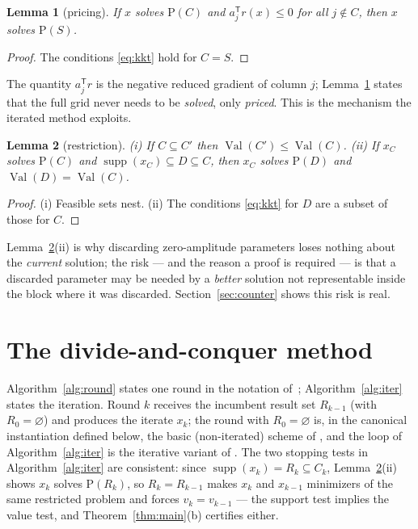 \documentclass[pdflatex,sn-mathphys-num]{sn-jnl}
\theoremstyle{thmstyleone}
\newtheorem{lemma}{Lemma}
\theoremstyle{thmstyletwo}
\newcommand{\supp}{\operatorname{supp}}
\newcommand{\Val}{\operatorname{Val}}
\newcommand{\T}{{\mathsf T}}
\newcommand{\prob}[1]{\mathrm{P}(#1)}
\begin{document}
\begin{lemma}[pricing]\label{lem:pricing}
If $x$ solves $\prob{C}$ and $a_j^{\T}r(x)\le0$ for all $j\notin C$,
then $x$ solves $\prob{S}$.
\end{lemma}
\begin{proof}
The conditions \eqref{eq:kkt} hold for $C=S$.
\end{proof}

The quantity $a_j^{\T}r$ is the negative reduced gradient of column
$j$; Lemma~\ref{lem:pricing} states that the full grid never needs to be
\emph{solved}, only \emph{priced}. This is the mechanism the iterated
method exploits.

\begin{lemma}[restriction]\label{lem:restrict}
\emph{(i)} If $C\subseteq C'$ then $\Val(C')\le\Val(C)$.
\emph{(ii)} If $x_C$ solves $\prob{C}$ and
$\supp(x_C)\subseteq D\subseteq C$, then $x_C$ solves $\prob{D}$ and
$\Val(D)=\Val(C)$.
\end{lemma}
\begin{proof}
(i) Feasible sets nest. (ii) The conditions \eqref{eq:kkt} for $D$ are a
subset of those for $C$.
\end{proof}

Lemma~\ref{lem:restrict}(ii) is why discarding zero-amplitude parameters
loses nothing about the \emph{current} solution; the risk --- and the
reason a proof is required --- is that a discarded parameter may be
needed by a \emph{better} solution not representable inside the block
where it was discarded. Section~\ref{sec:counter} shows this risk is
real.

\section{The divide-and-conquer method}\label{sec:alg}

Algorithm~\ref{alg:round} states one round in the notation
of~\cite{brookes2006}; Algorithm~\ref{alg:iter} states the iteration.
Round $k$ receives the incumbent result set $R_{k-1}$ (with
$R_0=\varnothing$) and produces the iterate $x_k$; the round with
$R_0=\varnothing$ is, in the canonical instantiation defined below, the
basic (non-iterated) scheme of \cite[Text~1]{brookes2006}, and the loop of Algorithm~\ref{alg:iter} is
the iterative variant of \cite[Section~3.2]{brookes2006}. The two
stopping
tests in Algorithm~\ref{alg:iter} are consistent: since
$\supp(x_k)=R_k\subseteq C_k$, Lemma~\ref{lem:restrict}(ii) shows
$x_k$ solves $\prob{R_k}$, so $R_k=R_{k-1}$ makes $x_k$ and $x_{k-1}$
minimizers of the same restricted problem and forces $v_k=v_{k-1}$ ---
the support test implies the value test, and
Theorem~\ref{thm:main}(b) certifies either.
\end{document}
